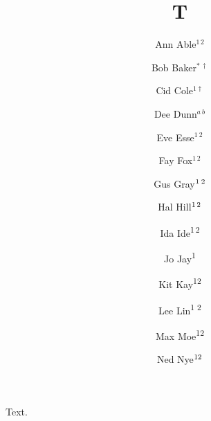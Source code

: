 \documentclass{article}
\title{T}
\author{Ann Able$^{1\,2}$ \and Bob Baker$^{*\,\dagger}$ \and Cid Cole$^{1\!\dagger}$ \and Dee Dunn$^{a\:b}$
  \and Eve Esse$^{1\ 2}$ \and Fay Fox$^{1\hspace{2pt}2}$ \and Gus Gray$^{1\kern2pt2}$ \and Hal Hill$^{1\mskip3mu2}$
  \and Ida Ide\textsuperscript{1\,2} \and Jo Jay\textsuperscript{1\-2} \and Kit Kay\textsuperscript{1\/2}
  \and Lee Lin\textsuperscript{1\hskip0pt 2} \and Max Moe\textsuperscript{1\hspace{0pt}2} \and Ned Nye$^{1\hskip0pt 2}$}
\begin{document}
\maketitle
Text.
\end{document}
